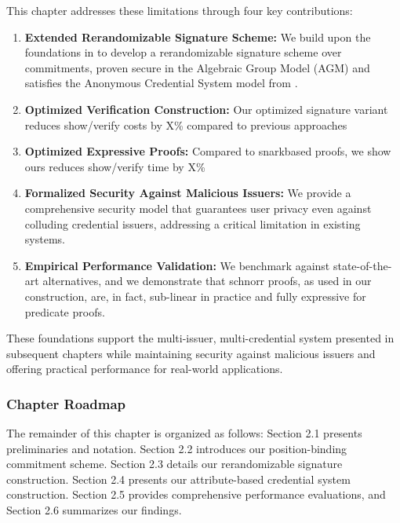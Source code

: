 This chapter addresses these limitations through four key contributions:
\begin{enumerate}
    \item \textbf{Extended Rerandomizable Signature Scheme:} We build upon the foundations in \cite{tomescu2022utt} to develop a rerandomizable signature scheme over commitments, proven secure in the Algebraic Group Model (AGM) and satisfies the Anonymous Credential System model from \cite{fuchsbauer_structure-preserving_2019}.
    
    \item \textbf{Optimized Verification Construction:} Our optimized signature variant reduces show/verify costs by X\% compared to previous approaches

    \item \textbf{Optimized Expressive Proofs:} Compared to snarkbased proofs, we show ours reduces show/verify time by X\%
    
    \item \textbf{Formalized Security Against Malicious Issuers:} We provide a comprehensive security model that guarantees user privacy even against colluding credential issuers, addressing a critical limitation in existing systems.
    
    \item \textbf{Empirical Performance Validation:} We benchmark against state-of-the-art alternatives, and we demonstrate that schnorr proofs, as used in our construction, are, in fact, sub-linear in practice and fully expressive for predicate proofs.
\end{enumerate}

These foundations support the multi-issuer, multi-credential system presented in subsequent chapters while maintaining security against malicious issuers and offering practical performance for real-world applications.


\subsubsection*{Chapter Roadmap}
The remainder of this chapter is organized as follows: Section 2.1 presents preliminaries and notation. Section 2.2 introduces our position-binding commitment scheme. Section 2.3 details our rerandomizable signature construction. Section 2.4 presents our attribute-based credential system construction. Section 2.5 provides comprehensive performance evaluations, and Section 2.6 summarizes our findings.


















